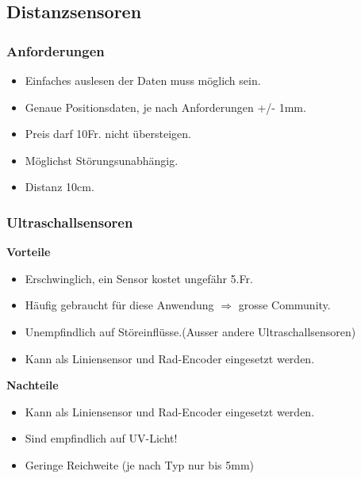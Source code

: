 \subsection*{Distanzsensoren}
\subsubsection{Anforderungen}
\begin{itemize}
\item Einfaches auslesen der Daten muss möglich sein.
\item Genaue Positionsdaten, je nach Anforderungen +/- 1mm.
\item Preis darf 10Fr. nicht übersteigen.
\item Möglichst Störungsunabhängig.
\item Distanz 10cm.
\end{itemize}

\subsubsection{Ultraschallsensoren}
\textbf {Vorteile}
\begin{itemize}
\item Erschwinglich, ein Sensor kostet ungefähr 5.Fr.
\item Häufig gebraucht für diese Anwendung $\Rightarrow$ grosse Community.
\item Unempfindlich auf Störeinflüsse.(Ausser andere Ultraschallsensoren)
\item Kann als Liniensensor und Rad-Encoder eingesetzt werden.\\
\end{itemize}
\textbf {Nachteile}
\begin{itemize}
\item Kann als Liniensensor und Rad-Encoder eingesetzt werden.
\item Sind empfindlich auf UV-Licht!
\item Geringe Reichweite (je nach Typ nur bis 5mm)
\end{itemize}
